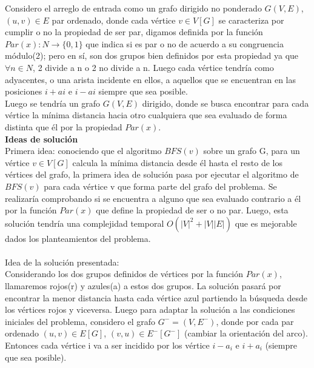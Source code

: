 \documentclass[12pt]{article}
\begin{document}
Considero el arreglo de entrada como un grafo dirigido no ponderado $G(V,E)$, $(u,v)\in E$ par ordenado, donde cada  
v\'ertice $v \in V[G]$ se caracteriza por cumplir o no la propiedad de ser par, digamos definida por la funci\'on $Par(x):N\rightarrow \{0,1\}$ que indica si es par o no de acuerdo a su congruencia m\'odulo(2); pero en s\'i,  
son dos grupos bien definidos por esta propiedad ya que $ \forall n\in N$, 2 divide a n o 2 no divide a n. Luego cada v\'ertice tendr\'ia como adyacentes, o una arista incidente en ellos, a aquellos que se encuentran en las  posiciones $i + ai$ e $i-ai$ siempre que sea posible.\\

Luego se tendr\'ia un grafo  $G(V,E)$ dirigido, donde se busca encontrar para cada v\'ertice la m\'inima distancia hacia otro cualquiera que  sea evaluado de forma distinta que \'el por la propiedad $Par(x)$.\\

\textbf{Ideas de soluci\'on}\\

Primera idea: conociendo que el algoritmo $BFS(v)$ sobre un grafo G, para un v\'ertice $v \in V[G]$ calcula la m\'inima distancia desde 
\'el hasta el resto de los v\'ertices del grafo, la primera idea de soluci\'on pasa por ejecutar el algoritmo de $BFS(v)$ para 
cada v\'ertice v que forma parte del grafo del problema. Se realizar\'ia 
comprobando si se encuentra a alguno que sea evaluado contrario a \'el por la funci\'on $Par(x)$ que define la propiedad de ser o no par. Luego, esta soluci\'on tendr\'ia una complejidad temporal $O(|V|^2+|V||E|)$ que es mejorable dados los 
planteamientos del problema.\\
\\

Idea de la soluci\'on presentada:\\

Considerando los dos grupos definidos de v\'ertices por la funci\'on $Par(x)$, llamaremos rojos(r) y azules(a) a estos dos grupos. La soluci\'on pasar\'a por encontrar la menor  distancia hasta cada v\'ertice azul partiendo la b\'usqueda desde los v\'ertices rojos y viceversa. Luego para adaptar la soluci\'on a las condiciones iniciales del problema, 
considero el grafo $G^-=(V,E^-)$, donde por cada par ordenado $(u,v)\in E[G]$, $(v,u)\in E^-[G^-]$
(cambiar la orientaci\'on del arco). Entonces cada v\'ertice i va a ser incidido por los v\'ertice $i-a_i$ e $i+a_i$ (siempre que sea posible). \\
\end{document}
